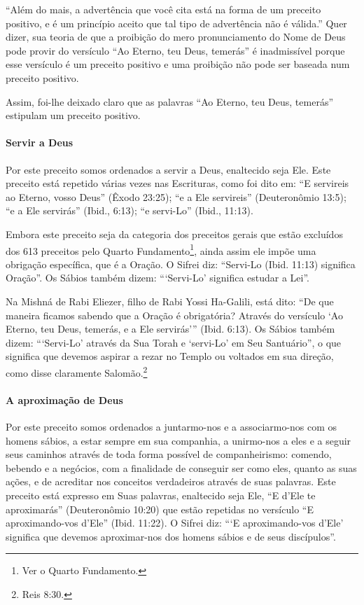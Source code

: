 ``Além do mais, a advertência que você cita está na forma de um preceito
positivo, e é um princípio aceito que tal tipo de advertência não é
válida.'' Quer dizer, sua teoria de que a proibição do mero
pronunciamento do Nome de Deus pode provir do versículo ``Ao Eterno, teu
Deus, temerás'' é inadmissível porque esse versículo é um preceito
positivo e uma proibição não pode ser baseada num preceito positivo.

Assim, foi-lhe deixado claro que as palavras ``Ao Eterno, teu Deus,
temerás'' estipulam um preceito positivo.

\paragraph{Servir a Deus}

Por este preceito somos ordenados a servir a Deus, enaltecido seja Ele.
Este preceito está repetido várias vezes nas Escrituras, como foi dito
em: ``E servireis ao Eterno, vosso Deus'' (Êxodo 23:25); ``e a Ele
servireis'' (Deuteronômio 13:5); ``e a Ele servirás'' (Ibid., 6:13); ``e servi-Lo''
(Ibid., 11:13).

Embora este preceito seja da categoria dos preceitos gerais que estão excluídos dos 613 preceitos pelo Quarto
Fundamento\footnote{Ver o Quarto Fundamento.}, ainda assim ele impõe uma obrigação
específica, que é a Oração. O Sifrei diz: ``Servi-Lo (Ibid. 11:13)
significa Oração''. Os Sábios também dizem: ```Servi-Lo' significa
estudar a Lei''.

Na Mishná de Rabi Eliezer, filho de Rabi Yossi Ha-Galili, está dito:
``De que maneira ficamos sabendo que a Oração é obrigatória? Através do
versículo `Ao Eterno, teu Deus, temerás, e a Ele servirás''' (Ibid.
6:13). Os Sábios também dizem: ```Servi-Lo' através da Sua Torah e
`servi-Lo' em Seu Santuário'', o que significa que devemos aspirar a
rezar no Templo ou voltados em sua direção, como disse claramente
Salomão.\footnote{Reis 8:30.}

\paragraph{A aproximação de Deus}

Por este preceito somos ordenados a juntarmo-nos e a associarmo-nos com
os homens sábios, a estar sempre em sua companhia, a unirmo-nos a eles e
a seguir seus caminhos através de toda forma possível de
companheirismo: comendo, bebendo e a negócios, com a finalidade de
conseguir ser como eles, quanto as suas ações, e de acreditar nos
conceitos verdadeiros através de suas palavras. Este preceito está
expresso em Suas palavras, enaltecido seja Ele, ``E d'Ele te
aproximarás'' (Deuteronômio 10:20) que estão repetidas no versículo ``E
aproximando-vos d'Ele'' (Ibid. 11:22). O Sifrei diz: ```E
aproximando-vos d'Ele' significa que devemos aproximar-nos dos homens
sábios e de seus discípulos''.


